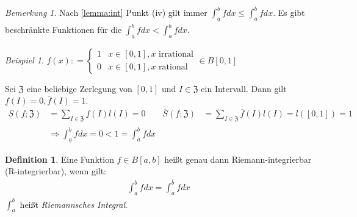 \documentclass[ngerman,titlepage,twoside, parskip=half*]{scrreprt}
\newcommand*{\ZZ}{\mathfrak{Z}}
\theoremstyle{plain}
\theoremstyle{definition}
\newtheorem{definition}{Definition}
\theoremstyle{remark}
\newtheorem*{remark}{Bemerkung}
\newtheorem*{beispiel}{Beispiel}
\newcommand*{\coloneqq}{\mathrel{\mathop:}=}
\begin{document}
\begin{remark}
  Nach \autoref{lemma:int} Punkt (iv) gilt immer
  $\int_{\underline{a}}^b fdx\leq \int_a^{\overline{b}}fdx$. Es gibt
  beschränkte Funktionen für die $\int_{\underline{a}}^b fdx<
  \int_a^{\overline{b}}fdx$.
\end{remark}

\begin{beispiel}
$f(x)\coloneqq
\begin{cases}
  1 & x\in [0,1], x \text{ irrational}\\
  0 & x\in [0,1], x \text{ rational}
\end{cases} \in B[0,1]$

Sei $\ZZ$ eine beliebige Zerlegung von $[0,1]$ und $I\in \ZZ$ ein Intervall.
Dann gilt $\underline{f}(I)=0, \overline{f}(I)=1$.
\begin{align*}
  \underline{S}(f;\ZZ)&= \sum_{I\in\ZZ} \underline{f}(I)l(I)=0&
  \overline{S}(f;\ZZ)&= \sum_{I\in\ZZ} \overline{f}(I)l(I)=l([0,1])=1\\
  &\Rightarrow \int_{\underline{a}}^b fdx =0 < 1= \int_a^{\overline{b}} fdx
\end{align*}
\end{beispiel}

\begin{definition}
  Eine Funktion $f\in B[a,b]$ heißt genau dann Riemann-integrierbar
  (R-integrierbar), wenn gilt:
  \begin{gather*}\int_{\underline{a}}^b fdx = \int_a^{\overline{b}} fdx\end{gather*}
  $\int_a^b$ heißt \emph{Riemannsches Integral}.
\end{definition}
\end{document}
